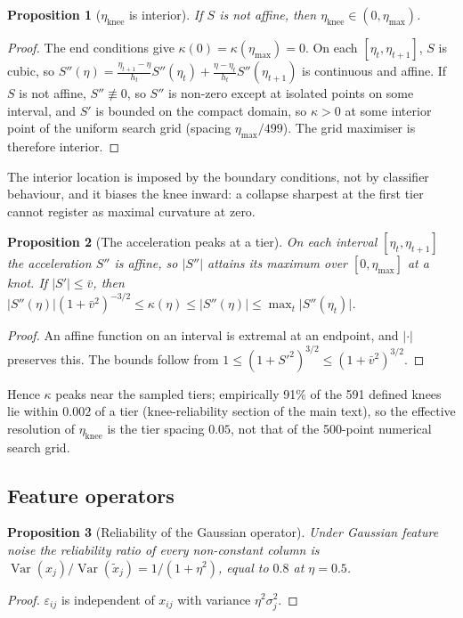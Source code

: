 \documentclass[pdflatex,sn-mathphys]{sn-jnl}
\newcommand{\etamax}{\eta_{\max}}
\newcommand{\etaknee}{\eta_{\mathrm{knee}}}
\theoremstyle{thmstyleone}
\newtheorem{supproposition}{Proposition}
\begin{document}
\begin{supproposition}[$\etaknee$ is interior]\label{prop:s_interior}
If $S$ is not affine, then $\etaknee\in(0,\etamax)$.
\end{supproposition}
\begin{proof}
The end conditions give $\kappa(0)=\kappa(\etamax)=0$. On each $[\eta_t,\eta_{t+1}]$, $S$ is cubic, so $S''(\eta)=\frac{\eta_{t+1}-\eta}{h_t}S''(\eta_t)+\frac{\eta-\eta_t}{h_t}S''(\eta_{t+1})$ is continuous and affine. If $S$ is not affine, $S''\not\equiv0$, so $S''$ is non-zero except at isolated points on some interval, and $S'$ is bounded on the compact domain, so $\kappa>0$ at some interior point of the uniform search grid (spacing $\etamax/499$). The grid maximiser is therefore interior.
\end{proof}
The interior location is imposed by the boundary conditions, not by classifier behaviour, and it biases the knee inward: a collapse sharpest at the first tier cannot register as maximal curvature at zero.

\begin{supproposition}[The acceleration peaks at a tier]\label{prop:s_peak}
On each interval $[\eta_t,\eta_{t+1}]$ the acceleration $S''$ is affine, so $\lvert S''\rvert$ attains its maximum over $[0,\etamax]$ at a knot. If $\lvert S'\rvert\le\bar v$, then $\lvert S''(\eta)\rvert(1+\bar v^{2})^{-3/2}\le\kappa(\eta)\le\lvert S''(\eta)\rvert\le\max_t\lvert S''(\eta_t)\rvert$.
\end{supproposition}
\begin{proof}
An affine function on an interval is extremal at an endpoint, and $\lvert\cdot\rvert$ preserves this. The bounds follow from $1\le(1+S'^{2})^{3/2}\le(1+\bar v^{2})^{3/2}$.
\end{proof}
Hence $\kappa$ peaks near the sampled tiers; empirically 91\% of the 591 defined knees lie within $0.002$ of a tier (knee-reliability section of the main text), so the effective resolution of $\etaknee$ is the tier spacing $0.05$, not that of the 500-point numerical search grid.

\subsection{Feature operators}
\begin{supproposition}[Reliability of the Gaussian operator]\label{prop:s_gaussian}
Under Gaussian feature noise the reliability ratio of every non-constant column is $\operatorname{Var}(x_j)/\operatorname{Var}(\tilde x_j)=1/(1+\eta^{2})$, equal to $0.8$ at $\eta=0.5$.
\end{supproposition}
\begin{proof}
$\varepsilon_{ij}$ is independent of $x_{ij}$ with variance $\eta^{2}\sigma_j^{2}$.
\end{proof}
\end{document}
